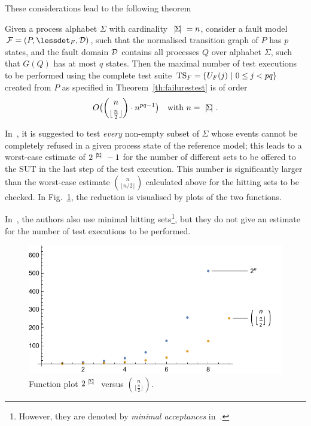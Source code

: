 These considerations lead to the following theorem
%
\begin{theorem}
Given a process alphabet $\Sigma$ with cardinality $
{~|\! \Sigma\!|~} = n$, consider a fault model ${\cal F} = (P,\lessdet_F,{\cal D})$, such that
the normalised transition graph of $P$ has $p$ states, and the fault domain 
${\cal D}$ contains all processes $Q$ over alphabet $\Sigma$, such that $G(Q)$ has at most $q$ states. Then the maximal 
number of test executions to be performed   using the complete test 
suite ${\text{TS}}_F = \{ U_F(j)~|~0 \le j < pq  \}$ created from $P$ as specified in Theorem~\ref{th:failurestest} is of order
%
\begin{equation*} 
O\big(\binom{n}{\lfloor\frac{n}{2}\rfloor}\cdot n^{pq-1}\big)\quad\text{with $n={~|\! \Sigma\!|~}$}.
\end{equation*} 
\xbox
\end{theorem}
%
In~\cite{Hennessy:1988:ATP:50497}, it is suggested to test {\it every}
non-empty subset of $\Sigma$ whose events cannot be completely refused in a
given process state of the reference model; this leads to a worst-case
estimate of $2^{{~|\! \Sigma\!|~}}-1$ for the number of different sets to be
offered to the SUT in the last step of the test execution. This number is significantly larger than the worst-case estimate $\binom{n}{\lfloor n/2\rfloor}$ calculated above for the 
hitting sets to be checked.
In Fig.~\ref{fig:minhita}, the reduction is visualised by plots of
the two functions. 



 
In~\cite{DBLP:conf/icfem/CavalcantiG07}, the authors also use minimal hitting
sets\footnote{However, they are denoted by {\it minimal acceptances}
in~\cite{DBLP:conf/icfem/CavalcantiG07}.}, but they do not give an estimate for the number of test executions to be performed.


 \begin{figure}
 \begin{center}
\includegraphics[width=.8\textwidth]{curvecomparison.pdf}
\end{center}
\caption{Function plot $2^{{~|\! \Sigma\!|~}}$ versus $\binom{n}{\lfloor \frac{n}{2}\rfloor}$.}
 \label{fig:minhita}
 \end{figure}
 
